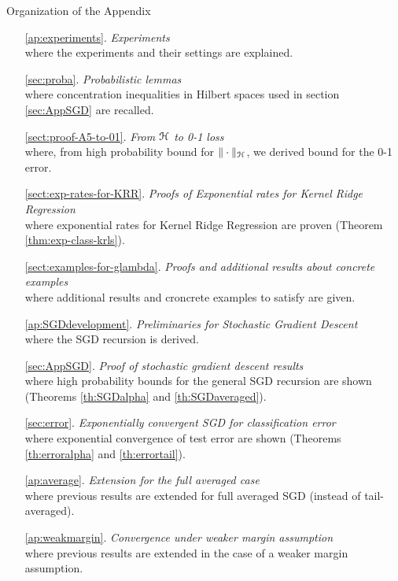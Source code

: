  
\clearpage

{\LARGE Organization of the Appendix}

\vspace{0.25cm}

\begin{enumerate}

\item[\ref{ap:experiments}.] {\em Experiments} \\where the experiments and their settings are explained.

\item[\ref{sec:proba}.] {\em Probabilistic lemmas} \\where concentration inequalities in Hilbert spaces used in section \ref{sec:AppSGD} are recalled.

\item[\ref{sect:proof-A5-to-01}.] {\em From ${\mathcal H}$ to 0-1 loss} \\where, from high probability bound for $\|\cdot\|_{\mathcal H}$, we derived bound for the 0-1 error.

\item[\ref{sect:exp-rates-for-KRR}.] {\em Proofs of Exponential rates for Kernel Ridge Regression} \\where exponential rates for Kernel Ridge Regression are proven (Theorem \ref{thm:exp-class-krls}).

\item[\ref{sect:examples-for-glambda}.] {\em Proofs and additional results about concrete examples} \\where additional results and croncrete examples to satisfy  are given.

\item[\ref{ap:SGDdevelopment}.] {\em Preliminaries for Stochastic Gradient Descent} \\where the SGD recursion is derived.

\item[\ref{sec:AppSGD}.] {\em Proof of stochastic gradient descent results} \\ where high probability bounds for the general SGD recursion are shown (Theorems \ref{th:SGDalpha} and \ref{th:SGDaveraged}).

\item[ \ref{sec:error}.] {\em Exponentially convergent SGD for classification error} \\where exponential convergence of test error are shown (Theorems \ref{th:erroralpha} and \ref{th:errortail}).

\item[\ref{ap:average}.] {\em Extension for the full averaged case} \\where previous results are extended for full averaged SGD (instead of tail-averaged).

\item[\ref{ap:weakmargin}.] {\em Convergence under weaker margin assumption} \\where previous results are extended in the case of a weaker margin assumption.
\end{enumerate}

